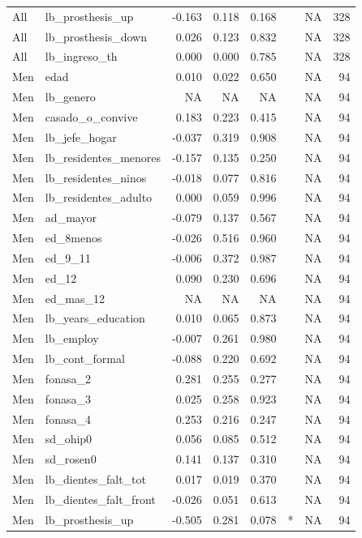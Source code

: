 \begin{table}
\begin{tabular}[t]{llrrrlrr}
All & lb\_prosthesis\_up & -0.163 & 0.118 & 0.168 &  & NA & 328\\
All & lb\_prosthesis\_down & 0.026 & 0.123 & 0.832 &  & NA & 328\\
All & lb\_ingreso\_th & 0.000 & 0.000 & 0.785 &  & NA & 328\\
\addlinespace
Men & edad & 0.010 & 0.022 & 0.650 &  & NA & 94\\
Men & lb\_genero & NA & NA & NA &  & NA & 94\\
Men & casado\_o\_convive & 0.183 & 0.223 & 0.415 &  & NA & 94\\
Men & lb\_jefe\_hogar & -0.037 & 0.319 & 0.908 &  & NA & 94\\
Men & lb\_residentes\_menores & -0.157 & 0.135 & 0.250 &  & NA & 94\\
\addlinespace
Men & lb\_residentes\_ninos & -0.018 & 0.077 & 0.816 &  & NA & 94\\
Men & lb\_residentes\_adulto & 0.000 & 0.059 & 0.996 &  & NA & 94\\
Men & ad\_mayor & -0.079 & 0.137 & 0.567 &  & NA & 94\\
Men & ed\_8menos & -0.026 & 0.516 & 0.960 &  & NA & 94\\
Men & ed\_9\_11 & -0.006 & 0.372 & 0.987 &  & NA & 94\\
\addlinespace
Men & ed\_12 & 0.090 & 0.230 & 0.696 &  & NA & 94\\
Men & ed\_mas\_12 & NA & NA & NA &  & NA & 94\\
Men & lb\_years\_education & 0.010 & 0.065 & 0.873 &  & NA & 94\\
Men & lb\_employ & -0.007 & 0.261 & 0.980 &  & NA & 94\\
Men & lb\_cont\_formal & -0.088 & 0.220 & 0.692 &  & NA & 94\\
\addlinespace
Men & fonasa\_2 & 0.281 & 0.255 & 0.277 &  & NA & 94\\
Men & fonasa\_3 & 0.025 & 0.258 & 0.923 &  & NA & 94\\
Men & fonasa\_4 & 0.253 & 0.216 & 0.247 &  & NA & 94\\
Men & sd\_ohip0 & 0.056 & 0.085 & 0.512 &  & NA & 94\\
Men & sd\_rosen0 & 0.141 & 0.137 & 0.310 &  & NA & 94\\
\addlinespace
Men & lb\_dientes\_falt\_tot & 0.017 & 0.019 & 0.370 &  & NA & 94\\
Men & lb\_dientes\_falt\_front & -0.026 & 0.051 & 0.613 &  & NA & 94\\
Men & lb\_prosthesis\_up & -0.505 & 0.281 & 0.078 & * & NA & 94\\

\end{tabular}
\end{table}
